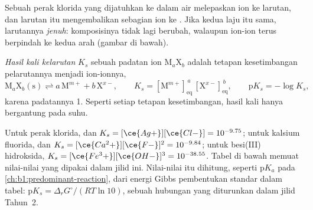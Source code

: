 Sebuah  perak klorida yang dijatuhkan ke dalam air melepaskan ion
ke larutan, dan larutan itu mengembalikan sebagian ion ke . Jika
kedua laju itu sama, larutannya \emph{jenuh}: komposisinya tidak lagi
berubah, walaupun ion-ion terus berpindah ke kedua arah (gambar di
bawah).

\begin{definition}\label{def:b1:precipitation:solubility-product}
\emph{Hasil kali kelarutan} $K_s$ sebuah
padatan ion $\mathrm{M}_a\mathrm{X}_b$ adalah tetapan kesetimbangan
pelarutannya menjadi ion-ionnya,
\[
  \mathrm{M}_a\mathrm{X}_b\mathrm{(s)} \rightleftharpoons a\,\mathrm{M}^{m+}
  + b\,\mathrm{X}^{x-}, \qquad
  K_s = [\mathrm{M}^{m+}]_{\mathrm{eq}}^{\,a}\,[\mathrm{X}^{x-}]_{\mathrm{eq}}^{\,b},
  \qquad \mathrm{p}K_s = -\log K_s ,
\]
karena  padatannya 1. Seperti setiap tetapan kesetimbangan,
hasil kali  hanya bergantung pada suhu.
\end{definition}

Untuk perak klorida,  dan $K_s =
[\ce{Ag+}][\ce{Cl-}] = 10^{-9.75}$; untuk kalsium fluorida,  dan $K_s = [\ce{Ca^2+}][\ce{F-}]^2 = 10^{-9.84}$; untuk
besi(III) hidroksida, $K_s = [\ce{Fe^3+}][\ce{OH-}]^3 = 10^{-38.55}$.
Tabel di bawah memuat nilai-nilai yang dipakai dalam jilid ini.
Nilai-nilai itu dihitung, seperti $\mathrm{p}K_a$ pada
\cref{ch:b1:predominant-reaction}, dari energi Gibbs pembentukan standar
dalam tabel: $\mathrm{p}K_s = \Delta_r G^\circ/(RT\ln 10)$, sebuah hubungan
yang diturunkan dalam jilid Tahun~2.

